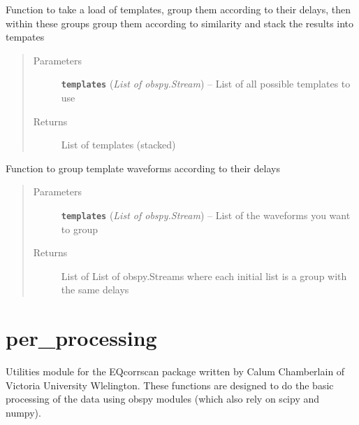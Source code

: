 \documentclass[a4paper,10pt,english]{sphinxmanual}
\begin{document}

\begin{fulllineitems}
\label{modules:clustering.generate_families}
Function to take a load of templates, group them according to their
delays, then within these groups group them according to similarity
and stack the results into tempates
\begin{quote}\begin{description}
\item[{Parameters}] \leavevmode
\textbf{\texttt{templates}} (\emph{List of obspy.Stream}) -- List of all possible templates to use

\item[{Returns}] \leavevmode
List of templates (stacked)

\end{description}\end{quote}

\end{fulllineitems}


\begin{fulllineitems}
\label{modules:clustering.group_delays}
Function to group template waveforms according to their delays
\begin{quote}\begin{description}
\item[{Parameters}] \leavevmode
\textbf{\texttt{templates}} (\emph{List of obspy.Stream}) -- List of the waveforms you want to group

\item[{Returns}] \leavevmode
List of List of obspy.Streams where each initial list is a group
with the same delays

\end{description}\end{quote}

\end{fulllineitems}



\section{per\_processing}
\label{modules:per-processing}\label{modules:module-pre_processing}
Utilities module for the EQcorrscan package written by Calum Chamberlain of
Victoria University Wlelington.  These functions are designed to do the basic
processing of the data using obspy modules (which also rely on scipy and numpy).
\end{document}

